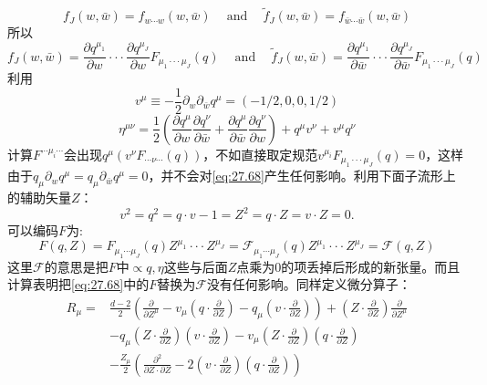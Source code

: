 \begin{equation}
	f_J(w,\bar{w})=f_{w\cdots w}(w,\bar{w})\quad\mathrm{~and~}\quad\tilde{f}_J(w,\bar{w})=f_{\bar{w}\cdots\bar{w}}(w,\bar{w})
\end{equation} 
所以
\begin{equation}\label{eq:27.68}
	f_J(w,\bar{w})=\frac{\partial q^{\mu_1}}{\partial w}\cdotp\cdotp\cdotp\frac{\partial q^{\mu_J}}{\partial w}F_{\mu_1\cdotp\cdotp\cdotp\mu_J}(q)\quad\mathrm{~and~}\quad\tilde{f}_J(w,\bar{w})=\frac{\partial q^{\mu_1}}{\partial\bar{w}}\cdotp\cdotp\cdotp\frac{\partial q^{\mu_J}}{\partial\bar{w}}F_{\mu_1\cdotp\cdotp\cdotp\mu_J}(q)
\end{equation}
利用
\begin{equation}
	v^{\mu}\equiv-\frac{1}{2}\partial_{w}\partial_{\bar{w}}q^{\mu}=(-1/2,0,0,1/2)
\end{equation}
\begin{equation}
	\eta^{\mu\nu}=\frac{1}{2}\left(\frac{\partial q^{\mu}}{\partial w}\frac{\partial q^{\nu}}{\partial\bar{w}}+\frac{\partial q^{\mu}}{\partial\bar{w}}\frac{\partial q^{\nu}}{\partial w}\right)+q^{\mu}v^{\nu}+v^{\mu}q^{\nu}
\end{equation}
计算$F^{\cdots\mu_i \cdots}$会出现$q^{\mu}\left(v^{\nu}F_{\cdots\nu\cdots}(q)\right)$，不如直接取定规范$v^{\mu_i}F_{\mu_1\cdot\cdot\cdot\mu_J}(q)=0$，这样由于$q_{\mu}\partial_{w}q^{\mu}=q_{\mu}\partial_{\bar{w}}q^{\mu}=0$，并不会对\ref{eq:27.68}产生任何影响。利用下面子流形上的辅助矢量$Z$：
\begin{equation}
	v^2=q^2=q\cdot v-1=Z^2=q\cdot Z=v\cdot Z=0.
\end{equation}
可以编码$F$为:
\begin{equation}
	F(q,Z)=F_{\mu_{1}\cdots\mu_{J}}(q)Z^{\mu_{1}}\cdotp\cdotp\cdotp Z^{\mu_{J}}=\mathcal{F}_{\mu_{1}\cdots\mu_{J}}(q)Z^{\mu_{1}}\cdotp\cdotp\cdotp Z^{\mu_{J}}=\mathcal{F}(q,Z)
\end{equation}
这里$\mathcal{F}$的意思是把$F$中$\propto q,\eta$这些与后面$Z$点乘为$0$的项丢掉后形成的新张量。而且计算表明把\ref{eq:27.68}中的$F$替换为$\mathcal{F}$没有任何影响。同样定义微分算子：
\begin{equation}
	\begin{aligned}
		R_{\mu}=& \frac{d-2}{2}\left(\frac{\partial}{\partial Z^{\mu}}-v_{\mu}\left(q\cdot\frac{\partial}{\partial Z}\right)-q_{\mu}\left(v\cdot\frac{\partial}{\partial Z}\right)\right)+\left(Z\cdot\frac{\partial}{\partial Z}\right)\frac{\partial}{\partial Z^{\mu}}  \\
		&-q_{\mu}\left(Z\cdot\frac\partial{\partial Z}\right)\left(v\cdot\frac\partial{\partial Z}\right)-v_{\mu}\left(Z\cdot\frac\partial{\partial Z}\right)\left(q\cdot\frac\partial{\partial Z}\right) \\
		&-\frac{Z_{\mu}}{2}\left(\frac{\partial^{2}}{\partial Z\cdot\partial Z}-2\left(v\cdot\frac{\partial}{\partial Z}\right)\left(q\cdot\frac{\partial}{\partial Z}\right)\right)
	\end{aligned}
\end{equation}
